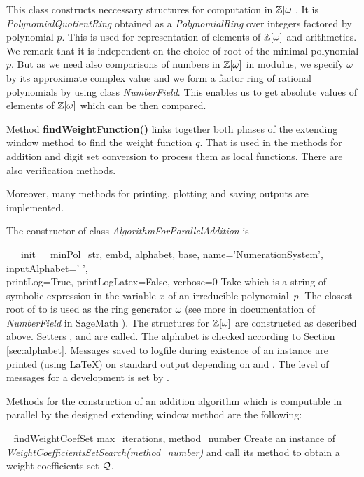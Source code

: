 This class constructs neccessary structures for computation in $\mathbb{Z}[\omega]$. It is \emph{PolynomialQuotientRing} obtained as a \emph{PolynomialRing} over integers factored by polynomial $p$. This is used for representation of elements of $\mathbb{Z}[\omega]$ and arithmetics. We remark that it is independent on the choice of root of the  minimal polynomial $p$. But as we need also comparisons of numbers in $\mathbb{Z}[\omega]$ in modulus, we specify $\omega$ by its approximate complex value and we form a factor ring of rational polynomials by using class \emph{NumberField}. This enables us to get absolute values of elements of $\mathbb{Z}[\omega]$ which can be then compared.

Method \textbf{findWeightFunction()} links together both phases of the extending window method to find the weight function $q$. That is used in the methods for addition and digit set conversion to process them as local functions. There are also verification methods.

Moreover, many methods for printing, plotting and saving outputs are implemented.

The constructor of class \emph{AlgorithmForParallelAddition} is 

\begin{method}{\_\_init\_\_}{minPol\_str, embd, alphabet, base, name='NumerationSystem', inputAlphabet=' ',\\
 printLog=True, printLogLatex=False, verbose=0}
Take  which is a string of symbolic expression in the variable $x$ of an irreducible polynomial~$p$. The closest root of   to  is used as the ring generator $\omega$ (see more in documentation of \emph{NumberField} in SageMath \cite{sage}). The structures for $\mathbb{Z}[\omega]$ are constructed as described above. Setters ,  and  are called. The alphabet is checked according to Section \ref{sec:alphabet}. Messages saved to logfile during existence of an instance are printed (using \LaTeX) on standard output depending on  and . The level of messages for a development is set by . 
\end{method}

Methods for the construction of an addition algorithm which is computable in parallel by the designed extending window method are the following:

\begin{method}{\_findWeightCoefSet}{ max\_iterations, method\_number}
Create an instance of \emph{WeightCoefficientsSetSearch(method\_number)} and call its method  to obtain a weight coefficients set $\mathcal{Q}$.
\end{method}

